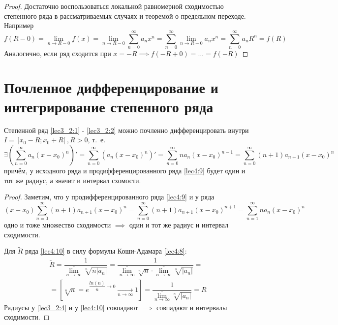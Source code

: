 \documentclass[../../main.tex]{subfiles}
\begin{document}
\begin{proof}
	Достаточно воспользоваться локальной равномерной сходимостью
	степенного ряда в рассматриваемых случаях и 
	теоремой о предельном переходе. Например
	\[ f(R - 0) = \underset{n \to R - 0}{\lim} f(x) = 
	\underset{n \to R - 0}{\lim} \sum\limits_{n = 0}^{\infty} a_n x^n =
	\sum\limits_{n = 0}^{\infty} \underset{n \to R - 0}{\lim} a_n x^n = 
	\sum\limits_{n = 0}^{\infty} a_n R^n = f(R)
	\]
	Аналогично, если ряд сходится при $x = -R \implies f(-R + 0) = 
	\ldots = f(-R)$
\end{proof}

\section{Почленное дифференцирование и интегрирование степенного ряда}

\begin{thm}
	Степенной ряд \eqref{lec3_2:1} - \eqref{lec3_2:2} можно почленно 
	дифференцировать внутри $I = \: ]x_0 - R; x_0 + R[ \:, R > 0$, т.~е.
	\begin{equation} \label{lec4:9}
		\exists \left( \sum\limits_{n = 0}^{\infty} a_n(x - x_0)^n \right)' = 
		\sum\limits_{n = 0}^{\infty} \left( a_n(x - x_0)^n \right)' = 
		\sum\limits_{n = 0}^{\infty} n a_n(x - x_0)^{n - 1} = 
		\sum\limits_{n = 0}^{\infty} (n + 1)a_{n + 1} (x - x_0)^n
	\end{equation} 
	причём, у исходного ряда и продифференцированного ряда 
	\eqref{lec4:9} будет один и тот же радиус, а значит и интервал схомости.
\end{thm}

\begin{proof}
	Заметим, что у продифференцированного ряда \eqref{lec4:9} и у ряда \\
	\begin{equation} \label{lec4:10}
		(x - x_0) \sum\limits_{n = 0}^{\infty} (n + 1)a_{n + 1}(x - x_0)^n = 
		\sum\limits_{n = 0}^{\infty} (n + 1) a_{n + 1} (x - x_0)^{n + 1} = 
		\sum\limits_{n = 1}^{\infty} n a_n (x - x_0)^n
	\end{equation}
	одно и тоже множество сходимости $\implies $ один и тот же 
	радиус и интервал сходимости.
	
	Для $\widetilde{R}$ ряда \eqref{lec4:10} в силу 
	формулы Коши-Адамара \eqref{lec4:8}: 
	\[ \begin{gathered}
	\widetilde{R} = \dfrac{1}{  \underset{n \to \infty}{\overline{\lim}}
	\sqrt[n]{n|a_n|}  } = 
	\dfrac{1}{  \underset{n \to \infty}{\overline{\lim}} \sqrt[n]{n}
	\cdot \underset{n \to \infty}{\overline{\lim}} \sqrt[n]{|a_n|}  } = \\
	= \left[ \sqrt[n]{n} = e^{ \dfrac{ln(n)}{n} \rightarrow 0 } 
	\underset{n \to \infty}{\longrightarrow} 1 \right] = 
	\dfrac{1}{  \underset{n \to \infty}{\overline{\lim}} \sqrt[n]{|a_n|} } = R
	\end{gathered} \]
	Радиусы у \eqref{lec3_2:4} и у \eqref{lec4:10} совпадают $\implies$ 
	совпадают и интервалы сходимости.
\end{proof}
\end{document}
